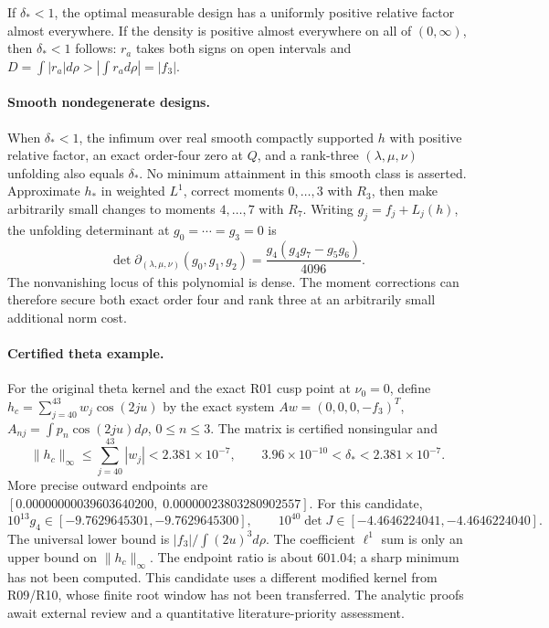 If $\delta_*<1$, the optimal measurable design has a uniformly positive
relative factor almost everywhere. If the density is positive almost
everywhere on all of $(0,\infty)$, then $\delta_*<1$ follows: $r_a$
takes both signs on open intervals and
$D=\int|r_a|d\rho>|\int r_ad\rho|=|f_3|$.

\paragraph{Smooth nondegenerate designs.}
When $\delta_*<1$, the infimum over real smooth compactly supported $h$
with positive relative factor, an exact order-four zero at $Q$, and a
rank-three $(\lambda,\mu,\nu)$ unfolding also equals $\delta_*$.
No minimum attainment in this smooth class is asserted. Approximate
$h_*$ in weighted $L^1$, correct moments $0,\ldots,3$ with $R_3$, then
make arbitrarily small changes to moments $4,\ldots,7$ with $R_7$.
Writing $g_j=f_j+L_j(h)$, the unfolding determinant at $g_0=\cdots=g_3=0$
is
\[
 \det\partial_{(\lambda,\mu,\nu)}(g_0,g_1,g_2)
       =\frac{g_4(g_4g_7-g_5g_6)}{4096}.
\]
The nonvanishing locus of this polynomial is dense. The moment
corrections can therefore secure both exact order four and rank three
at an arbitrarily small additional norm cost.

\paragraph{Certified theta example.}
For the original theta kernel and the exact R01 cusp point at $\nu_0=0$,
define $h_c=\sum_{j=40}^{43}w_j\cos(2ju)$ by the exact system
$Aw=(0,0,0,-f_3)^T$, $A_{nj}=\int p_n\cos(2ju)d\rho$, $0\le n\le3$.
The matrix is certified nonsingular and
\[
 \|h_c\|_\infty\le\sum_{j=40}^{43}|w_j|<2.381\times10^{-7},
 \qquad
 3.96\times10^{-10}<\delta_*<2.381\times10^{-7}.
\]
More precise outward endpoints are
$[0.00000000039603640200,\;0.00000023803280902557]$.
For this candidate,
\[
 10^{13}g_4\in[-9.7629645301,-9.7629645300],\qquad
 10^{40}\det J\in[-4.4646224041,-4.4646224040].
\]
The universal lower bound is $|f_3|/\int(2u)^3d\rho$. The coefficient
$\ell^1$ sum is only an upper bound on $\|h_c\|_\infty$.
The endpoint ratio is about $601.04$; a sharp minimum has not been
computed. This candidate uses a different modified kernel from R09/R10,
whose finite root window has not been transferred. The analytic proofs
await external review and a quantitative literature-priority assessment.
